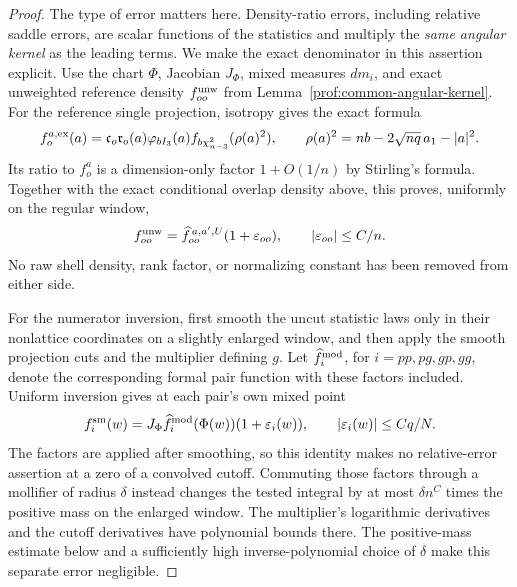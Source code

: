 \begin{proof}
The type of error matters here. Density-ratio errors, including relative
saddle errors, are scalar functions of the statistics and multiply the
\emph{same angular kernel} as the leading terms. We make the exact
denominator in this assertion explicit. Use the chart \(\Phi\),
Jacobian \(J_\Phi\), mixed measures \(dm_i\), and exact unweighted
reference density \(f_{oo}^{\rm unw}\) from
Lemma~\ref{prof:common-angular-kernel}. For the reference single
projection, isotropy gives the exact formula
\[
 f_o^{a,\rm ex}(a)=\mathfrak c_o\mathfrak r_o(a)
     \varphi_{bI_3}(a)f_{b\chi^2_{n-3}}(\rho(a)^2),
 \qquad \rho(a)^2=nb-2\sqrt{nq}\,a_1-|a|^2.
\]
Its ratio to \(f_o^a\) is a dimension-only factor \(1+O(1/n)\)
by Stirling's formula. Together with the exact conditional overlap
density above, this proves, uniformly on the regular window,
\[
 f_{oo}^{\rm unw}=\widehat f_{oo}^{\,a,a',U}(1+\varepsilon_{oo}),
 \qquad |\varepsilon_{oo}|\le C/n.
\]
No raw shell density, rank factor, or normalizing constant has
been removed from either side.

For the numerator inversion, first smooth the uncut statistic laws
only in their nonlattice coordinates on a slightly enlarged window,
and then apply the smooth projection cuts and the multiplier defining
\(g\). Let \(\widehat f_i^{\rm mod}\), for
\(i=pp,pg,gp,gg\), denote the corresponding formal pair function
with these factors included. Uniform inversion gives at each pair's
own mixed point
\[
 f_i^{\rm sm}(w)
 =J_\Phi\widehat f_i^{\rm mod}(\Phi(w))(1+\varepsilon_i(w)),
 \qquad |\varepsilon_i(w)|\le Cq/N.
\]
The factors are applied after smoothing, so this identity makes no
relative-error assertion at a zero of a convolved cutoff. Commuting
those factors through a mollifier of radius \(\delta\) instead
changes the tested integral by at most \(\delta n^C\) times the
positive mass on the enlarged window. The multiplier's logarithmic
derivatives and the cutoff derivatives have polynomial bounds there. The
positive-mass estimate below and a sufficiently high inverse-polynomial
choice of \(\delta\) make this separate error negligible.


\end{proof}
